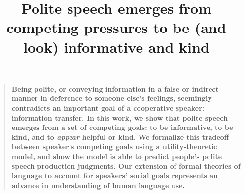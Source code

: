 \documentclass[12pt]{article}
\title{Polite speech emerges from competing pressures to be (and look)
informative and kind}
\author
%
{Erica J. Yoon,$^{1\ast\dagger}$ Michael Henry Tessler,$^{1\ast}$ Noah D. Goodman,$^{1}$ Michael C. Frank$^{1}$\\
\\
\normalsize{$^{1}$Department of Psychology, Stanford University,}\\
\normalsize{450 Serra Mall, Stanford, CA 94305.}
\\
\normalsize{$^\ast$These authors contributed equally to this work.}
\\
\normalsize{$^\dagger$To whom correspondence should be addressed; E-mail: ejyoon@stanford.edu.}
}
\date{}
\newenvironment{sciabstract}{%
\begin{quote} \bf}
{\end{quote}}
\begin{document}
 


\baselineskip24pt


\maketitle 






\begin{sciabstract}
Being polite, or conveying information in a false or indirect manner in
deference to someone else's feelings, seemingly contradicts an important
goal of a cooperative speaker: information transfer. In this work, we
show that polite speech emerges from a set of competing goals: to be
informative, to be kind, and to \emph{appear} helpful or kind. We
formalize this tradeoff between speaker's competing goals using a
utility-theoretic model, and show the model is able to predict people's
polite speech production judgments. Our extension of formal theories of
language to account for speakers' social goals represents an advance in
understanding of human language use.
\end{sciabstract}
\end{document}
